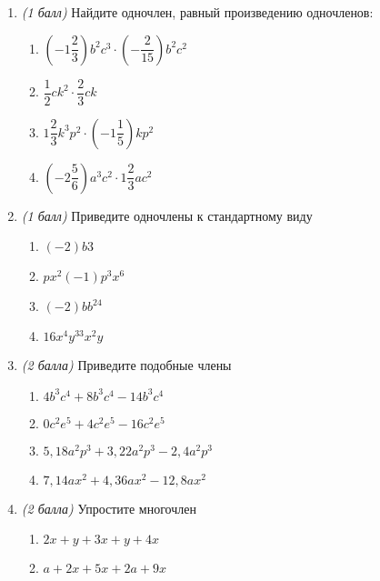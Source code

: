 \documentclass[12pt, a4paper]{article}
\begin{document}
	
	
	\begin{enumerate}
		\item \textit{(1 балл)} Найдите одночлен, равный произведению одночленов:
		\begin{multicols}{2}
			\begin{enumerate}[label=\asbuk*)]
				\item $\left( -1\dfrac{2}{3}\right)b^2c^3 \cdot \left( -\dfrac{2}{15}\right)b^2c^2  $
				\item $\dfrac{1}{2}ck^2 \cdot \dfrac{2}{3}ck$
				\item $1\dfrac{2}{3}k^3p^2 \cdot \left(-1 \dfrac{1}{5} \right) kp^2$
				\item $\left( -2\dfrac{5}{6}\right) a^3c^2 \cdot 1 \dfrac{2}{3}ac^2$
			\end{enumerate}
		\end{multicols}
		\item \textit{(1 балл)} Приведите одночлены к стандартному виду
		\begin{multicols}{2}
			\begin{enumerate}[label=\asbuk*)]
				\item $(-2)b3$
				\item $px^2(-1)p^3x^6$
				\item $(-2)bb^24$
				\item $16x^4y^33x^2y$
			\end{enumerate}
		\end{multicols}
		\item \textit{(2 балла)} Приведите подобные члены
		\begin{multicols}{2}
			\begin{enumerate}[label=\asbuk*)]
				\item $4b^3c^4+8b^3c^4-14b^3c^4$
				\item $0c^2e^5+4c^2e^5-16c^2e^5$
				\item $5,18a^2p^3+3,22a^2p^3-2,4a^2p^3$
				\item $7,14ax^2+4,36ax^2-12,8ax^2$
			\end{enumerate}
		\end{multicols}
		\item \textit{(2 балла)} Упростите многочлен
		\begin{multicols}{2}
			\begin{enumerate}[label=\asbuk*)]
				\item $2x+y+3x+y+4x$
				\item $a+2x+5x+2a+9x$

\end{enumerate}
\end{multicols}
\end{enumerate}
\end{document}
